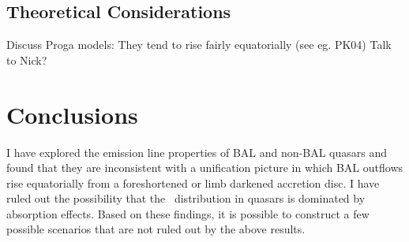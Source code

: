 \subsection{Theoretical Considerations}

Discuss Proga models: They tend to rise fairly equatorially (see eg. PK04) Talk to Nick?


\section{Conclusions}
\label{sec:ew_conclusions}
I have explored the emission line properties of BAL and non-BAL quasars 
and found that they are inconsistent with a unification picture in which 
BAL outflows rise equatorially from a foreshortened or limb darkened accretion
disc. I have ruled out the possibility that the \ewo\ distribution in quasars
is dominated by absorption effects. Based on these findings, it is possible to 
construct a few possible scenarios that are not ruled out by the above results.
